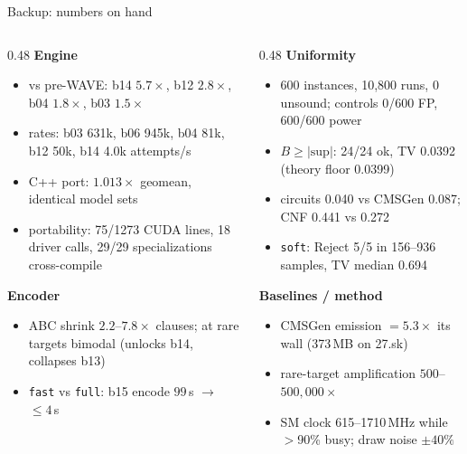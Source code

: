 \documentclass[aspectratio=169,11pt]{beamer}
\begin{document}
\appendix
\begin{frame}{Backup: numbers on hand}
  \footnotesize
  \begin{columns}[T]
    \begin{column}{0.48\textwidth}
      \textbf{Engine}
      \begin{itemize}
        \item vs pre-WAVE: b14 $5.7\times$, b12 $2.8\times$, b04 $1.8\times$, b03 $1.5\times$
        \item rates: b03 631k, b06 945k, b04 81k, b12 50k, b14 4.0k attempts/s
        \item C++ port: $1.013\times$ geomean, identical model sets
        \item portability: 75/1273 CUDA lines, 18 driver calls, 29/29 specializations cross-compile
      \end{itemize}
      \textbf{Encoder}
      \begin{itemize}
        \item ABC shrink $2.2$--$7.8\times$ clauses; at rare targets bimodal (unlocks b14, collapses b13)
        \item \texttt{fast} vs \texttt{full}: b15 encode $99$\,s $\rightarrow$ ${\le}4$\,s
      \end{itemize}
    \end{column}
    \begin{column}{0.48\textwidth}
      \textbf{Uniformity}
      \begin{itemize}
        \item 600 instances, 10{,}800 runs, 0 unsound; controls 0/600 FP, 600/600 power
        \item $B\ge|\text{sup}|$: 24/24 ok, TV 0.0392 (theory floor 0.0399)
        \item circuits 0.040 vs CMSGen 0.087; CNF 0.441 vs 0.272
        \item \texttt{soft}: Reject 5/5 in 156--936 samples, TV median 0.694
      \end{itemize}
      \textbf{Baselines / method}
      \begin{itemize}
        \item CMSGen emission $= 5.3\times$ its wall (373\,MB on 27.sk)
        \item rare-target amplification $500$--$500{,}000\times$
        \item SM clock 615--1710\,MHz while $>$90\% busy; draw noise $\pm40\%$
      \end{itemize}
    \end{column}
  \end{columns}
\end{frame}


\end{document}
